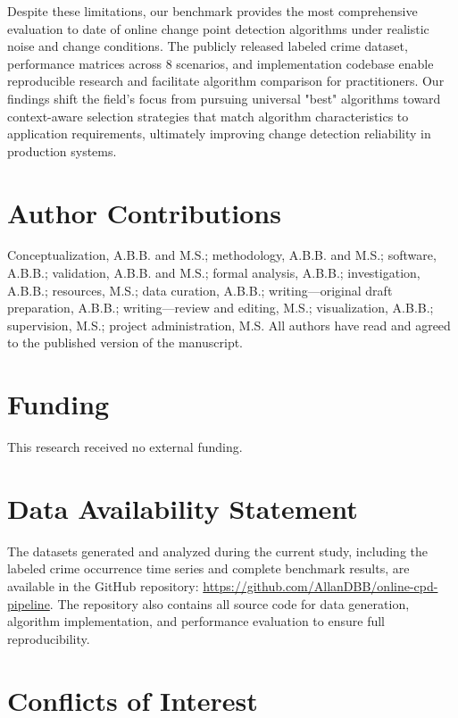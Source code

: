 \documentclass[journal,article,submit,pdftex,moreauthors]{Definitions/mdpi}
\begin{document}
Despite these limitations, our benchmark provides the most comprehensive evaluation to date of online change point detection algorithms under realistic noise and change conditions. The publicly released labeled crime dataset, performance matrices across 8 scenarios, and implementation codebase enable reproducible research and facilitate algorithm comparison for practitioners. Our findings shift the field's focus from pursuing universal "best" algorithms toward context-aware selection strategies that match algorithm characteristics to application requirements, ultimately improving change detection reliability in production systems.

\section*{Author Contributions}

Conceptualization, A.B.B. and M.S.; methodology, A.B.B. and M.S.; software, A.B.B.; validation, A.B.B. and M.S.; formal analysis, A.B.B.; investigation, A.B.B.; resources, M.S.; data curation, A.B.B.; writing—original draft preparation, A.B.B.; writing—review and editing, M.S.; visualization, A.B.B.; supervision, M.S.; project administration, M.S. All authors have read and agreed to the published version of the manuscript.

\section*{Funding}

This research received no external funding.

\section*{Data Availability Statement}

The datasets generated and analyzed during the current study, including the labeled crime occurrence time series and complete benchmark results, are available in the GitHub repository: \url{https://github.com/AllanDBB/online-cpd-pipeline}. The repository also contains all source code for data generation, algorithm implementation, and performance evaluation to ensure full reproducibility.

\section*{Conflicts of Interest}
\end{document}
